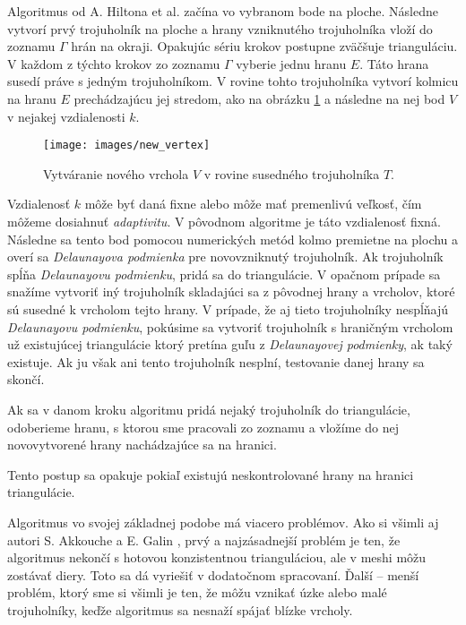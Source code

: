 Algoritmus od A. Hiltona et al. začína vo vybranom bode na ploche. 
Následne vytvorí prvý trojuholník na ploche a hrany vzniknutého 
trojuholníka vloží do zoznamu $\Gamma$ hrán na okraji. 
Opakujúc sériu krokov postupne zväčšuje trianguláciu. V každom z týchto krokov zo zoznamu $\Gamma$
vyberie jednu hranu $E$. Táto hrana susedí práve s jedným trojuholníkom. V rovine tohto 
trojuholníka vytvorí kolmicu na hranu $E$ prechádzajúcu jej stredom, 
ako na obrázku \ref{obr:new_vertex} a následne na nej bod 
$V$ v nejakej vzdialenosti $k$. 

\begin{figure}
    \centerline{\texttt{[image: images/new\_vertex]}}
    \caption[Vytváranie nového vrchola]
    {Vytváranie nového vrchola $V$ v rovine susedného trojuholníka $T$.}
    \label{obr:new_vertex}
\end{figure}

Vzdialenosť $k$ môže byť daná fixne alebo môže mať premenlivú veľkosť, čím môžeme dosiahnuť \textit{adaptivitu}.
V pôvodnom algoritme je táto vzdialenosť fixná. 
Následne sa tento bod pomocou numerických metód kolmo premietne na plochu a overí sa 
\textit{Delaunayova podmienka} pre novovzniknutý trojuholník. 
Ak trojuholník spĺňa \textit{Delaunayovu podmienku}, pridá sa do triangulácie. V opačnom prípade sa snažíme 
vytvoriť iný trojuholník skladajúci sa z pôvodnej hrany a vrcholov, ktoré sú susedné k vrcholom tejto hrany. 
V prípade, že aj tieto trojuholníky nespĺňajú \textit{Delaunayovu podmienku}, pokúsime sa vytvoriť 
trojuholník s hraničným vrcholom už existujúcej triangulácie ktorý pretína guľu z 
\textit{Delaunayovej podmienky}, ak taký existuje. Ak ju však ani tento trojuholník nesplní, 
testovanie danej hrany sa skončí.

Ak sa v danom kroku algoritmu pridá nejaký trojuholník do triangulácie, odoberieme hranu, 
s ktorou sme pracovali zo zoznamu a vložíme do nej novovytvorené hrany nachádzajúce sa na hranici.

Tento postup sa opakuje pokiaľ existujú neskontrolované hrany na hranici triangulácie.

Algoritmus vo svojej základnej podobe má viacero problémov. Ako si všimli aj autori S. Akkouche 
a E. Galin \cite{akkouche2001adaptive}, prvý a najzásadnejší problém je ten,
že algoritmus nekončí s hotovou konzistentnou trianguláciou, ale v meshi môžu zostávať diery. Toto sa
dá vyriešiť v dodatočnom spracovaní. Ďalší -- menší problém, ktorý sme si všimli
je ten, že môžu vznikať úzke alebo malé trojuholníky, keďže algoritmus sa nesnaží spájať blízke vrcholy.

